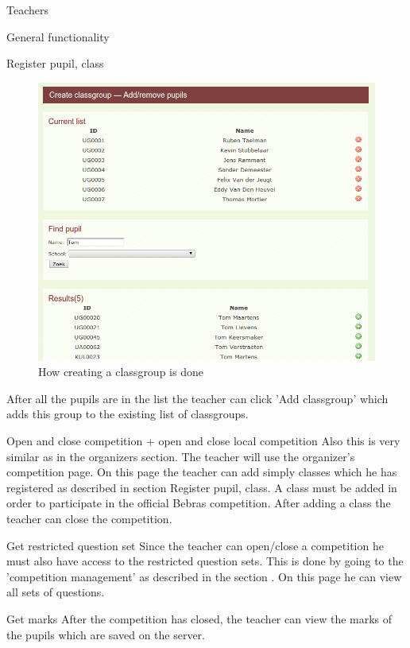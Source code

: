 \begin{section}{Teachers}
\begin{subsection}{General functionality}
\begin{subsubsection}{Register pupil, class}
	\begin{figure}[!h]
			  \centering
				\includegraphics[width=1\textwidth]{img/add_remove_pupil_classgroup.png}
			  \caption{How creating a classgroup is done}
			  \label{create_classgroup}
			\end{figure}
	After all the pupils are in the list the teacher can click 'Add classgroup' which adds this group to the existing list
	of classgroups. 
	\end{subsubsection}
	\begin{subsubsection}{Open and close competition + open and close local competition}
	Also this is very similar as in the organizers section. The teacher will use the organizer's competition page.
	On this page the teacher can add simply classes which he has registered as described in section Register pupil, class.
	A class must be added in order to participate in the official Bebras competition. After adding a class the teacher can
	close the competition.\\
	\end{subsubsection}
	\begin{subsubsection}{Get restricted question set}
	Since the teacher can open/close a competition he must also have access to the restricted question sets. This is done by going
	to the 'competition management' as described in the section . On this page he can view all sets of questions.
	\end{subsubsection}
	\begin{subsubsection}{Get marks}
	After the competition has closed, the teacher can view the marks of the pupils which are saved on the server.\\

\end{subsubsection}
\end{subsection}
\end{section}
